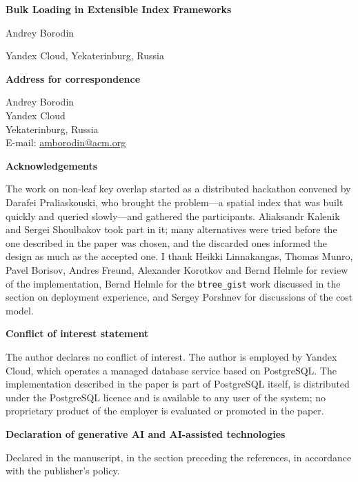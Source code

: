 \documentclass[11pt, a4paper]{article}
\newcommand{\code}[1]{\texttt{#1}}
\begin{document}
\begin{center}
{\Large\textbf{Bulk Loading in Extensible Index Frameworks}}

\vspace{6mm}

{\large Andrey Borodin}

\vspace{2mm}

Yandex Cloud, Yekaterinburg, Russia
\end{center}

\vspace{8mm}

\noindent\textbf{Address for correspondence}

\medskip

\noindent Andrey Borodin\\
Yandex Cloud\\
Yekaterinburg, Russia\\
E-mail: \href{mailto:amborodin@acm.org}{amborodin@acm.org}

\vspace{8mm}

\noindent\textbf{Acknowledgements}

\medskip

\noindent
The work on non-leaf key overlap started as a distributed hackathon convened by
Darafei Praliaskouski, who brought the problem---a spatial index that was built
quickly and queried slowly---and gathered the participants. Aliaksandr Kalenik
and Sergei Shoulbakov took part in it; many alternatives were tried before the
one described in the paper was chosen, and the discarded ones informed the
design as much as the accepted one. I thank Heikki Linnakangas, Thomas Munro,
Pavel Borisov, Andres Freund, Alexander Korotkov and Bernd Helmle for review of
the implementation, Bernd Helmle for the \code{btree\_gist} work discussed in
the section on deployment experience, and Sergey Porshnev for discussions of the
cost model.

\vspace{8mm}

\noindent\textbf{Conflict of interest statement}

\medskip

\noindent
The author declares no conflict of interest. The author is employed by Yandex
Cloud, which operates a managed database service based on PostgreSQL. The
implementation described in the paper is part of PostgreSQL itself, is
distributed under the PostgreSQL licence and is available to any user of the
system; no proprietary product of the employer is evaluated or promoted in the
paper.

\vspace{8mm}

\noindent\textbf{Declaration of generative AI and AI-assisted technologies}

\medskip

\noindent
Declared in the manuscript, in the section preceding the references, in
accordance with the publisher's policy.
\end{document}
